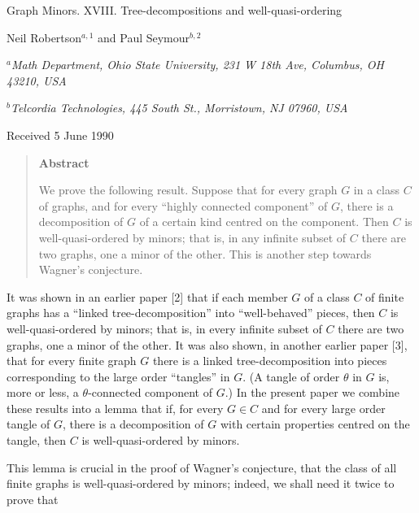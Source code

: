{\centering
{\Large Graph Minors. XVIII. Tree-decompositions and well-quasi-ordering\par}\medskip

Neil Robertson$^{a,1}$ and Paul Seymour$^{b,2}$\par
$^a$\textit{Math Department, Ohio State University, 231 W 18th Ave, Columbus, OH 43210, USA}\par
$^b$\textit{Telcordia Technologies, 445 South St., Morristown, NJ 07960, USA}\par
Received 5 June 1990\par
}
\begin{quote}
\textbf{Abstract}

We prove the following result. Suppose that for every graph $G$ in a class $C$ of graphs, and for every ``highly connected component'' of $G$, there is a decomposition of $G$ of a certain kind centred on the component. Then $C$ is well-quasi-ordered by minors; that is, in any infinite subset of $C$ there are two graphs, one a minor of the other. This is another step towards Wagner's conjecture.
\end{quote}


It was shown in an earlier paper [2] that if each member $G$ of a class $C$ of finite graphs has a ``linked tree-decomposition'' into ``well-behaved'' pieces, then $C$ is well-quasi-ordered by minors; that is, in every infinite subset of $C$ there are two graphs, one a minor of the other. It was also shown, in another earlier paper [3], that for every finite graph $G$ there is a linked tree-decomposition into pieces corresponding to the large order ``tangles'' in $G$. (A tangle of order $\theta$ in $G$ is, more or less, a $\theta$-connected component of $G$.) In the present paper we combine these results into a lemma that if, for every $G \in C$ and for every large order tangle of $G$, there is a decomposition of $G$ with certain properties centred on the tangle, then $C$ is well-quasi-ordered by minors.

This lemma is crucial in the proof of Wagner's conjecture, that the class of all finite graphs is well-quasi-ordered by minors; indeed, we shall need it twice to prove that%
%
